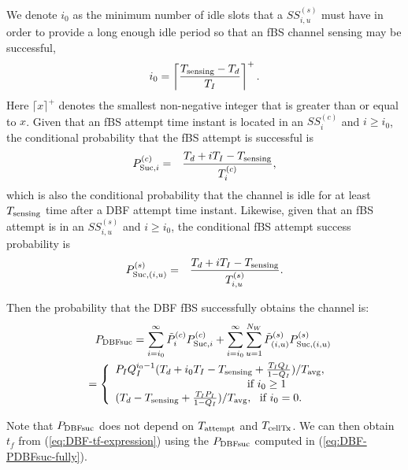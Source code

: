 \documentclass[journal,final,letterpaper,10pt,doublecolumn,twoside]{IEEEtran}
\begin{document}
We denote $i_0$ as the minimum number of idle slots that a $SS^{(s)}_{i,u}$ must have in order to provide a long enough idle period so that an fBS channel sensing may be successful,
\begin{equation}
   i_0 = \left\lceil \frac{T_{\textmd{sensing}}-T_d}{T_I} \right\rceil^+.
\end{equation}
Here $\lceil x \rceil^+$ denotes the smallest non-negative integer that is
greater than or equal to $x$.
Given that an fBS attempt time instant is located in an $SS^{(c)}_{i}$ and $i \geq i_0 $, the conditional probability that the fBS attempt is successful is
\begin{eqnarray}
P^{(c)}_{\textmd{Suc},i} &=&  \frac{T_d + i T_I  - T_{\textmd{sensing}}}{T^{(c)}_{i}} ,
\end{eqnarray}
which is also the conditional probability that the channel is idle for at least $T_{\textmd{sensing}}$ time after a DBF attempt time instant.
Likewise, given that an fBS attempt is in an $SS^{(s)}_{i,u}$ and $i \geq i_0 $, the conditional fBS attempt success probability is
\begin{eqnarray}
P^{(s)}_{\textmd{Suc},(i,u)} &=&  \frac{T_d + i T_I  - T_{\textmd{sensing}}}{ T^{(s)}_{i,u} }  .
\end{eqnarray}

Then the probability that the DBF fBS successfully obtains the channel
is:
\begin{eqnarray}
&&P_{\textmd{DBFsuc}} =
\sum_{i=i_0}^{\infty} \tilde{P}^{(c)}_{i} P^{(c)}_{\textmd{Suc},i}  + \sum_{i=i_0}^{\infty} \sum_{u=1}^{N_W} \tilde{P}^{(s)}_{(i,u)} P^{(s)}_{\textmd{Suc},(i,u)}  \nonumber \\
&&=
 \left\{ \begin{array}{l}
P_I Q_I^{i_0 -1}(T_d + i_0 T_I  - T_{\textmd{sensing}} + \frac{T_I Q_I}{1- Q_I}) /  T_{\textmd{avg}}, \\
~~~~~~~~~~~~~~~~~~~~~~~~~~~~~~~~~~~~\textmd{if} ~ i_0 \geq 1  \\
(T_d - T_{\textmd{sensing}} + \frac{T_I P_I}{1- Q_I}) /
T_{\textmd{avg}}, ~~ \textmd{if} ~  i_0 =0 .
\end{array} \right . \label{eq:DBF-PDBFsuc-fully}
\end{eqnarray}

Note that $P_{\textmd{DBFsuc}}$ does not depend on
$T_{\textmd{attempt}}$ and $T_{\textmd{cellTx}}$. We can then obtain
$t_f$ from (\ref{eq:DBF-tf-expression}) using the
$P_{\textmd{DBFsuc}}$ computed in (\ref{eq:DBF-PDBFsuc-fully}).
\end{document}
